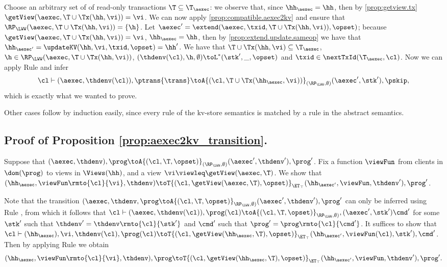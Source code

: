 Choose an arbitrary set of of read-only transactions $\T \subseteq \T_{\aexec}$: 
we observe that, since $\hh_{\aexec} = \hh$, then  by \cref{prop:getview.tx} $\getView(\aexec, \T \cup \Tx(\hh, \vi)) = \vi$. 
We can now apply \cref{prop:compatible.aexec2kv} and ensure that $\RP_{\LWW}(\aexec, \T \cup \Tx(\hh, \vi)) = \{\h\}$.
Let $\aexec' = \extend(\aexec, \txid, \T \cup \Tx(\hh, \vi)), \opset)$; because $\getView(\aexec, \T \cup \Tx(\hh, \vi)) = \vi$, 
$\hh_{\aexec} = \hh$,
then by \cref{prop:extend.update.sameop} we have that $\hh_{\aexec'} = \updateKV(\hh, \vi, \txid, \opset) = \hh'$. 
We  have that $\T \cup \Tx(\hh, \vi) \subseteq \T_{\aexec}$, $\h \in \RP_{\LWW}(\aexec, \T \cup \Tx(\hh, \vi))$,
$(\thdenv(\cl), \h, \emptyset) \toL^{\ast} (\stk', \_, \opset)$ and $\txid \in \nextTxId(\T_{\aexec}, \cl)$. 
Now we can apply Rule  and infer
\[
\cl \vdash (\aexec, \thdenv(\cl)), \ptrans{\trans} \toA{(\cl, \T \cup \Tx(\hh_{\aexec}, \vi))}_{(\RP_{\LWW}, \emptyset)} 
(\aexec', \stk'), \pskip,
\]
which is exactly what we wanted to prove. 

\ac{Other cases follow by induction easily, since every rule of the kv-store semantics is 
matched by a rule in the abstract semantics.}

\subsection{Proof of Proposition \ref{prop:aexec2kv_transition}.}
\label{sec:aexec2kv-transaction}

Suppose that $(\aexec, \thdenv), \prog \toA{(\cl, \T, \opset)}_{(\RP_{\LWW}, \emptyset)} (\aexec', \thdenv'), \prog'$. 
Fix a function $\viewFun$ from clients in $\dom(\prog)$ to views in $\Views(\hh)$, and a view $\vi \viewleq \getView(\aexec, \T)$.
We show that 
$(\hh_{\aexec}, \viewFun\rmto{\cl}{\vi}, \thdenv) \toT{(\cl, \getView(\aexec, \T), \opset)}_{\ET_{\top}} (\hh_{\aexec'}, 
\viewFun, \thdenv'), \prog'$. 

Note that the transition $(\aexec, \thdenv, \prog \toA{(\cl, \T, \opset)}_{\RP_{\LWW}, \emptyset)} (\aexec', \thdenv'), \prog'$ 
can only be inferred using Rule , from which it follows that $\cl \vdash (\aexec, \thdenv(\cl)), \prog(\cl) 
\toA{(\cl, \T, \opset)}_{\RP_{\LWW}, \emptyset)}, (\aexec' ,\stk') \cmd'$ for some $\stk'$ such that $\thdenv' = 
\thdenv\rmto{\cl}{\stk'}$ and $\cmd'$ such that $\prog' = \prog\rmto{\cl}{\cmd'}$.
It suffices to show that $\cl \vdash (\hh_{\aexec}), \vi, \thdenv(\cl), \prog(\cl) \toT{(\cl, \getView(\hh_{\aexec}, \T), \opset)}_{\ET_{\top}} 
(\hh_{\aexec'}, \viewFun(\cl), \stk'), \cmd'$. Then by applying Rule  we obtain 
\[
(\hh_{\aexec}, \viewFun\rmto{\cl}{\vi}, \thdenv), \prog \toT{(\cl, \getView(\hh_{\aexec}, \T), \opset)}_{\ET_{\top}} 
(\hh_{\aexec'}, \viewFun, \thdenv'), \prog'.
\]

